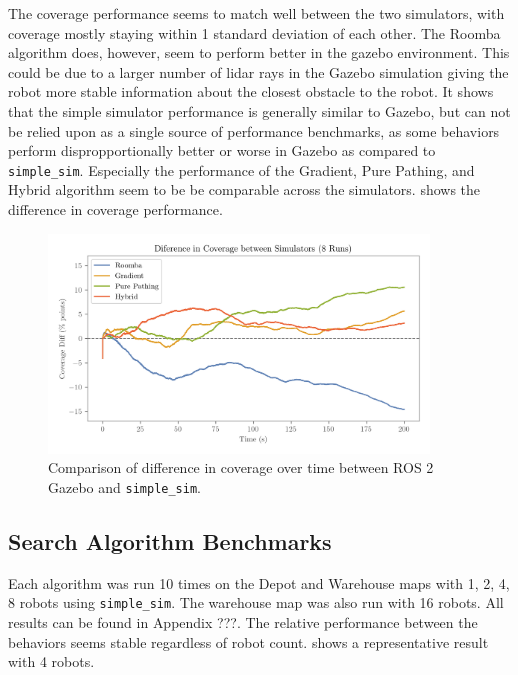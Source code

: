 The coverage performance seems to match well between the two simulators, with coverage mostly staying within 1 standard deviation of each other. The Roomba algorithm does, however, seem to perform better in the gazebo environment. This could be due to a larger number of lidar rays in the Gazebo simulation giving the robot more stable information about the closest obstacle to the robot. It shows that the simple simulator performance is generally similar to Gazebo, but can not be relied upon as a single source of performance benchmarks, as some behaviors perform dispropportionally better or worse in Gazebo as compared to \texttt{simple\_sim}. Especially the performance of the Gradient, Pure Pathing, and Hybrid algorithm seem to be be comparable across the simulators.  shows the difference in coverage performance.

\begin{figure}
    \begin{center}
        \includegraphics[width=0.90\textwidth]{./figures/plots/consistency/sim_coverage_diff.png}
    \end{center}
    \caption{Comparison of difference in coverage over time between ROS 2 Gazebo and \texttt{simple\_sim}.}
    \label{fig:coverage-benchmark-diff}
\end{figure}


\subsection{Search Algorithm Benchmarks}
\label{sec:search-algorithms-benchmark}
Each algorithm was run 10 times on the Depot and Warehouse maps with 1, 2, 4, 8 robots using \texttt{simple\_sim}. The warehouse map was also run with 16 robots. All results can be found in {\color{red} Appendix ???}. The relative performance between the behaviors seems stable regardless of robot count.  shows a representative result with 4 robots.

